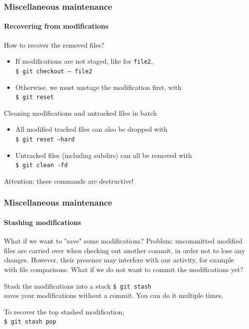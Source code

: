 \begin{frame}
\frametitle{Miscellaneous maintenance}
\framesubtitle{Recovering from modifications}

\begin{block}{How to recover the removed files?}
\begin{itemize}
\item If modifications are not staged, like for \texttt{file2}, \\
\texttt{\$ git checkout --- file2}
\item Otherwise, we must unstage the modification first, with \\
\texttt{\$ git reset}
\end{itemize}
\end{block}

\pause
\begin{block}{Cleaning modifications and untracked files in batch}
\begin{itemize}
\item All modified tracked files can also be dropped with \\
\texttt{\$ git reset ---hard}
\item Untracked files (including subdirs) can all be removed with \\
\texttt{\$ git clean -fd}
\end{itemize}
Attention: these commands are destructive!
\end{block}

\end{frame}

\begin{frame}
\frametitle{Miscellaneous maintenance}
\framesubtitle{Stashing modifications}

\begin{block}{What if we want to "save" some modifications?}
Problem: uncommitted modified files are carried over when checking out another commit, in order not to lose any changes. However, their presence may interfere with our activity, for example with file comparisons. What if we do not want to commit the modifications yet?
\end{block}

\pause
\begin{block}{Stash the modifications into a stack}
\texttt{\$ git stash} \\ 
saves your modifications without a commit. You can do it multiple times. 

To recover the top stashed modification, \\
\texttt{\$ git stash pop}
\end{block}

\end{frame}

